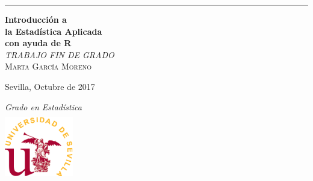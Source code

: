 \begin{titlepage} %
	
	\raggedleft %
	
	\rule{1pt}{\textheight} %
	\hspace{0.05\textwidth} %
	\parbox[b]{0.75\textwidth}{ %
		
		{\Huge\bfseries Introducción a \\[0.6\baselineskip]
la Estadística Aplicada\\[0.6\baselineskip] 
con ayuda de R}\\[2\baselineskip] %
		{\large\textit{TRABAJO FIN DE GRADO}}\\[4\baselineskip] %
		{\Large\textsc{Marta García Moreno}} %
	\bigskip %

	{\large Sevilla, Octubre de 2017} %
		
		
		\vspace{0.3\textheight} %
		
		{\Large\textit{Grado en Estadística}}\\[1.5\baselineskip]
		
		{\noindent \includegraphics[width=3cm,height=3cm]{logo}}\\[\baselineskip] %
	}

\vfill %

\cleardoublepage
\thispagestyle{empty}

\end{titlepage}

\raggedbottom


%

